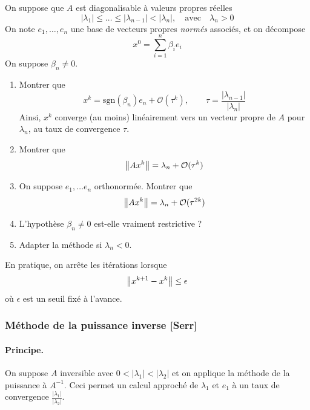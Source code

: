 \begin{exercice}
\label{exo:puissance}
On suppose que $A$ est diagonalisable à valeurs propres réelles 
\[
|\lambda_1| \leq \dots \leq |\lambda_{n-1}| < {|\lambda_n|, \quad \textrm{avec} \quad \lambda_n > 0}
\]
On note $e_1,\dots,e_n$ une base de vecteurs propres \emph{normés} associés,
et on décompose $$x^0 = \sum_{i=1}^{n} \beta_i e_i$$
On suppose $\beta_n \neq 0$.
\begin{enumerate}
\item Montrer que
\[
	x^k = \mathrm{sgn}(\beta_n)e_n + \mathcal O(\tau ^k), \qquad \tau = \frac{|\lambda_{n-1}|}{|\lambda_n|}
\]
Ainsi, $x^k$ converge (au moins)  linéairement vers un vecteur propre de $A$
pour $\lambda_n${,} au taux de convergence $\tau$.
\item Montrer que
\[
\left\|Ax^k\right\|= \lambda_n + \mathcal{O} (\tau^k)
\]
\item On suppose $e_1,\dots e_n$ orthonormée. Montrer que
\[
\left\|Ax^k\right\| = \lambda_n + \mathcal{O} (\tau^{2k})
\]
\item L'hypothèse $\beta_n \neq 0$ est-elle vraiment restrictive ?
\item Adapter la méthode si $\lambda_n < 0$.
\end{enumerate}
\end{exercice}

\begin{remark}
En pratique, on arrête les itérations lorsque
\[
{\left\|x^{k+1}-x^k\right\|} \leq \epsilon
\]
où $\epsilon$ est un seuil fixé à l'avance.
\end{remark}

\subsubsection{Méthode de la puissance inverse [Serr]}

\paragraph*{Principe.}
On suppose $A$ inversible {avec $0 < |\lambda_1| < |\lambda_2|$} et on
applique la méthode de la puissance à $A^{-1}$. Ceci permet un calcul
approché de $\lambda_1$ et $e_1$ à un taux de convergence
$\frac{|\lambda_1|}{|\lambda_2|}$.

